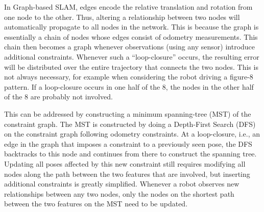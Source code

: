 In Graph-based SLAM, edges encode the relative translation and rotation from one node to the other. Thus, altering a relationship between two nodes will automatically propagate to all nodes in the network. This is because the graph is essentially a chain of nodes whose edges consist of odometry measurements. This chain then becomes a graph whenever observations (using any sensor) introduce additional constraints. Whenever such a ``loop-closure'' occurs, the resulting error will be distributed over the entire trajectory that connects the two nodes. This is not always necessary, for example when considering the robot driving a figure-8 pattern. If a loop-closure occurs in one half of the 8, the nodes in the other half of the 8 are probably not involved.

This can be addressed by constructing a  minimum spanning-tree  (MST) of the constraint graph. The MST is constructed by doing a Depth-First Search (DFS) on the constraint graph following odometry constraints. At a loop-closure, i.e., an edge in the graph that imposes a constraint to a previously seen pose, the DFS backtracks to this node and continues from there to construct the spanning tree. Updating all poses affected by this new constraint still requires modifying all nodes along the path between the two features that are involved, but inserting additional constraints is greatly simplified. Whenever a robot observes new relationships between any two nodes, only the nodes on the shortest path between  the two features on the MST need to be updated. %


